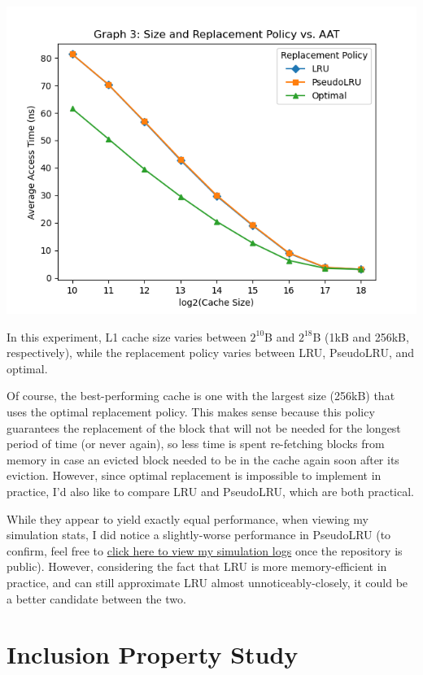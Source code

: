 \documentclass{article}
\begin{document}
    \includegraphics[width=\textwidth]{../graph_logs/graph3.png}

    In this experiment, L1 cache size varies between $2^{10}$B and $2^{18}$B (1kB and 256kB, respectively), while 
    the replacement policy varies between LRU, PseudoLRU, and optimal.

    Of course, the best-performing cache is one with the largest size (256kB) that uses the optimal replacement policy. 
    This makes sense because this policy guarantees the replacement of the block that will not be needed for the longest 
    period of time (or never again), so less time is spent re-fetching blocks from memory in case an evicted block 
    needed to be in the cache again soon after its eviction. However, since optimal replacement is impossible to implement 
    in practice, I'd also like to compare LRU and PseudoLRU, which are both practical.

    While they appear to yield exactly equal performance, when viewing my simulation stats, I did notice a slightly-worse 
    performance in PseudoLRU (to confirm, feel free to 
    \href{https://github.com/kobeeraveendran/cda5106/blob/master/hw/MachineProblem1_Fall2021/cachesim/graph_logs/simulation_logs.txt}
    {click here to view my simulation logs} once the repository is public). However, considering the fact that LRU is more memory-efficient in practice, and can 
    still approximate LRU almost unnoticeably-closely, it could be a better candidate between the two.

    \newpage

    \section{Inclusion Property Study}
    
\end{document}
